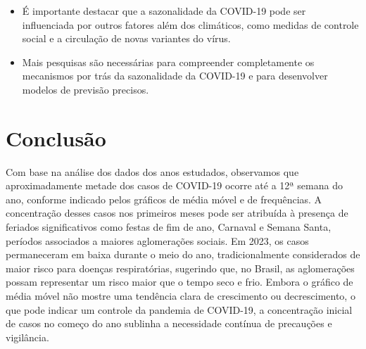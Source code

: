 \documentclass[a4paper,12pt]{report}
\begin{document}
\begin{itemize}
    \item É importante destacar que a sazonalidade da COVID-19 pode ser influenciada por outros fatores além dos climáticos, como medidas de controle social e a circulação de novas variantes do vírus.

    \item Mais pesquisas são necessárias para compreender completamente os mecanismos por trás da sazonalidade da COVID-19 e para desenvolver modelos de previsão precisos.
\end{itemize}


\section*{Conclusão}
Com base na análise dos dados dos anos estudados, observamos que aproximadamente metade dos casos de COVID-19 ocorre até a 12ª semana do ano, conforme indicado pelos gráficos de média móvel e de frequências. A concentração desses casos nos primeiros meses pode ser atribuída à presença de feriados significativos como festas de fim de ano, Carnaval e Semana Santa, períodos associados a maiores aglomerações sociais.
Em 2023, os casos permaneceram em baixa durante o meio do ano, tradicionalmente considerados de maior risco para doenças respiratórias, sugerindo que, no Brasil, as aglomerações possam representar um risco maior que o tempo seco e frio.
Embora o gráfico de média móvel não mostre uma tendência clara de crescimento ou decrescimento, o que pode indicar um controle da pandemia de COVID-19, a concentração inicial de casos no começo do ano sublinha a necessidade contínua de precauções e vigilância.
\end{document}

